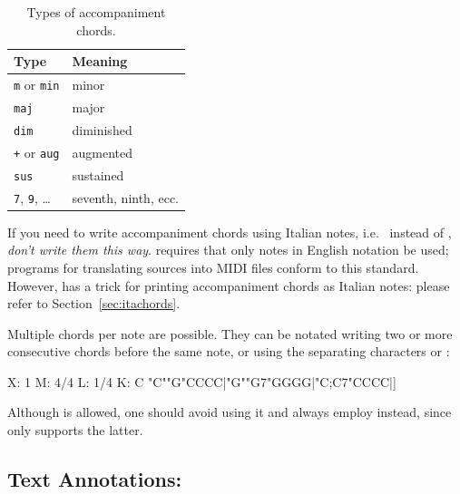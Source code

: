 \documentclass[a4paper,fullpage,12pt]{book}
\begin{document}

\begin{table}
\begin{center}
\begin{tabular}{ll}
\toprule %
\textbf{Type} & \textbf{Meaning} \\
\midrule %
\texttt{m} or \texttt{min} & minor \\
\texttt{maj} & major \\
\texttt{dim} & diminished \\
\texttt{+} or \texttt{aug} & augmented \\
\texttt{sus} & sustained \\
\texttt{7}, \texttt{9}, {\ldots} & seventh, ninth, ecc. \\
\bottomrule %
\end{tabular}
\caption{Types of accompaniment chords.}
\label{tab:chords}
\end{center}
\end{table}

\begin{vimp}

  If you need to write accompaniment chords using Italian notes, i.e.\
   instead of , \emph{don't write them this
  way}. \ABC{} requires that only notes in English notation be
  used; programs for translating sources into MIDI files conform to
  this standard. However, \abcm{} has a trick for printing
  accompaniment chords as Italian notes: please refer to
  Section~\ref{sec:itachords}.

\end{vimp}

Multiple chords per note are possible. They can be notated writing two
or more consecutive chords before the same note, or using the
separating characters \car{;} or :

\begin{abcsource}
X: 1
M: 4/4
L: 1/4
K: C
%
"C""G"CCCC|"G""G7"GGGG|"C;C7"CCCC|]
\end{abcsource}


Although  is allowed, one should avoid using it and always
employ \car{;} instead, since \abcmid{} only supports the latter.


\subsection{Text Annotations: }
\end{document}
